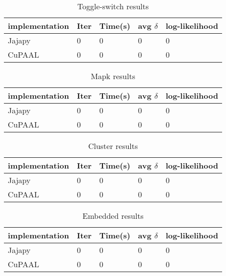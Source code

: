 \begin{table}[!htb]
    \centering
    \caption{Toggle-switch results}
    \label{tab:toggle_results}
    \begin{tabular}{lllll}
        \toprule
        implementation & Iter & Time(s) & avg $\delta$ & log-likelihood \\
        \midrule
        Jajapy         & 0    & 0       & 0            & 0              \\
        CuPAAL         & 0    & 0       & 0            & 0              \\
        \bottomrule
    \end{tabular}
\end{table}

\begin{table}[!htb]
    \centering
    \caption{Mapk results}
    \label{tab:mapk_results}
    \begin{tabular}{lllll}
        \toprule
        implementation & Iter & Time(s) & avg $\delta$ & log-likelihood \\
        \midrule
        Jajapy         & 0    & 0       & 0            & 0              \\
        CuPAAL         & 0    & 0       & 0            & 0              \\
        \bottomrule
    \end{tabular}
\end{table}

\begin{table}[!htb]
    \centering
    \caption{Cluster results}
    \label{tab:cluster_results}
    \begin{tabular}{lllll}
        \toprule
        implementation & Iter & Time(s) & avg $\delta$ & log-likelihood \\
        \midrule
        Jajapy         & 0    & 0       & 0            & 0              \\
        CuPAAL         & 0    & 0       & 0            & 0              \\
        \bottomrule
    \end{tabular}
\end{table}

\begin{table}[!htb]
    \centering
    \caption{Embedded results}
    \label{tab:embedded_results}
    \begin{tabular}{lllll}
        \toprule
        implementation & Iter & Time(s) & avg $\delta$ & log-likelihood \\
        \midrule
        Jajapy         & 0    & 0       & 0            & 0              \\
        CuPAAL         & 0    & 0       & 0            & 0              \\
        \bottomrule
    \end{tabular}
\end{table}


